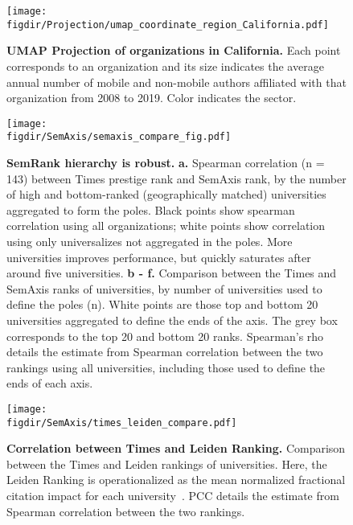 \documentclass[12pt]{article} %
\def\figdir{../Figs}
\begin{document}
%
%
\begin{figure}[hp!]
	\centering
	\texttt{[image: \\figdir/Projection/umap\_coordinate\_region\_California.pdf]}
	\caption{
		\textbf{UMAP Projection of organizations in California.}
		Each point corresponds to an organization and its size indicates the average annual number of mobile and non-mobile authors affiliated with that organization from 2008 to 2019. 
		Color indicates the sector. 
	}
	\label{fig:supp:proj_california}
\end{figure}




%
%
\begin{figure}[hp!]
	\centering
	\texttt{[image: \\figdir/SemAxis/semaxis\_compare\_fig.pdf]}
	\caption{
		\textbf{SemRank hierarchy is robust.}
		\textbf{a.} Spearman correlation (n = 143) between Times prestige rank and SemAxis rank, by the number of high and bottom-ranked (geographically matched) universities aggregated to form the poles.
		Black points show spearman correlation using all organizations; white points show correlation using only universalizes not aggregated in the poles. 
		More universities improves performance, but quickly saturates after around five universities.
		\textbf{b - f.} Comparison between the Times and SemAxis ranks of universities, by number of universities used to define the poles (n).
		White points are those top and bottom 20 universities aggregated to define the ends of the axis.
		The grey box corresponds to the top 20 and bottom 20 ranks.
	  	Spearman's rho details the estimate from Spearman correlation between the two rankings using all universities, including those used to define the ends of each axis. 
	}
	\label{fig:supp:semaxis_compare}
\end{figure}


%
%
\begin{figure}[hp!]
	\centering
	\texttt{[image: \\figdir/SemAxis/times\_leiden\_compare.pdf]}
	\caption{
		\textbf{Correlation between Times and Leiden Ranking.}
		Comparison between the Times and Leiden rankings of universities.
		Here, the Leiden Ranking is operationalized as the mean normalized fractional citation impact for each university~\autocite{waltman2012leidenrankings}. 
	  	PCC details the estimate from Spearman correlation between the two rankings.
	}
	\label{fig:supp:times_vs_leiden}
\end{figure}
\end{document}
